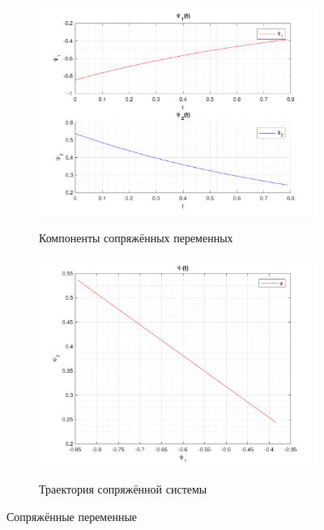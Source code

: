 \documentclass[11pt, oneside, final]{article}
\theoremstyle{break}
\numberwithin{equation}{section}
\theoremstyle{plain}
\theoremstyle{definition}
\begin{document}
    \begin{figure}[H]
        \begin{subfigure}{0.5\linewidth}
            \centering
            \includegraphics[width=\linewidth]{s2fig5}
            \label{pic:s2:5}
            \caption{Компоненты сопряжённых переменных}
        \end{subfigure}
        \begin{subfigure}{0.5\linewidth}
            \centering
            \includegraphics[width=\linewidth]{s2fig6}
            \label{pic:s2:6}
            \caption{Траектория сопряжённой системы}
        \end{subfigure}
        \caption{Сопряжённые переменные}
    \end{figure}
    \pagebreak
\end{document}
